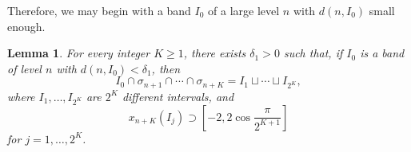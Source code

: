 \documentclass{amsart}
\newtheorem{lemm}[thm]{Lemma}
\theoremstyle{definition}
\begin{document}
Therefore, we may begin with a band $I_0$ of a large level $n$
 with $d(n,I_0)$ small enough.




\begin{lemm}
\label{lemma3}
For every integer $K\ge 1$, there exists $\delta_1>0$ such that, 
if $I_0$ is a band of level $n$  with $d(n,I_0)<\delta_1$, then  
\begin{equation*}
 I_0\cap\sigma_{n+1}\cap\cdots\cap\sigma_{n+K}
=I_1\sqcup\cdots\sqcup I_{2^K},
\end{equation*}
    where $I_1,\ldots,I_{2^K}$ are $2^K$ different intervals,
    and
\begin{equation*}
    x_{n+K}(I_j)\supset [-2,2\cos{\frac{\pi}{2^{K+1}}}]
\end{equation*}
    for  $ j=1,\ldots, 2^K$.
\end{lemm}
\end{document}
